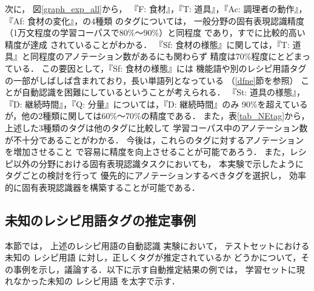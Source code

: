 \documentclass[japanese]{jnlp_1.4}
\begin{document}
次に，
図\ref{graph_exp_all}から，
『F: 食材』，『T: 道具』，『Ac: 調理者の動作』，『Af: 食材の変化』，の4種類
のタグについては，
一般分野の固有表現認識精度（1万文程度の学習コーパスで80\%〜90\%）と同程度
であり，すでに比較的高い精度が達成
されていることがわかる．
『Sf: 食材の様態』に関しては，『T: 道具』と同程度のアノテーション数があるにも関わらず
精度は70\%程度にとどまっている．
この要因として，『Sf: 食材の様態』には
機能語や別のレシピ用語タグの一部がしばしば含まれており，長い単語列となっている
（\ref{dfne}節を参照）
ことが自動認識を困難にしているということが考えられる．
『St: 道具の様態』，『D: 継続時間』，『Q: 分量』については，『D: 継続時間』のみ
90\%を超えているが，他の2種類に関しては60\%〜70\%の精度である． 
また，表\ref{tab_NEtag}から，上述した3種類のタグは他のタグに比較して
学習コーパス中のアノテーション数が不十分であることがわかる．
今後は，これらのタグに対するアノテーションを増加させること
で容易に精度を向上させることが可能であろう．
また，レシピ以外の分野における固有表現認識タスクにおいても，
本実験で示したようにタグごとの検討を行って
優先的にアノテーションするべきタグを選択し，
効率的に固有表現認識器を構築することが可能である．


\subsection{未知のレシピ用語タグの推定事例}
\label{est_unk}

本節では，
上述のレシピ用語の自動認識
実験において，
テストセットにおける未知の
レシピ用語
に対し，正しくタグが推定されているか
どうかについて，その事例を示し，議論する．以下に示す自動推定結果の例では，
学習セットに現れなかった未知の
レシピ用語
を太字で示す．
\end{document}
